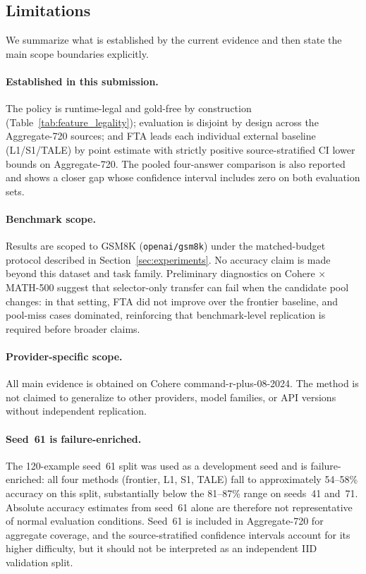 \subsection{Limitations}
\label{sec:limitations}

We summarize what is established by the current evidence and then state the
main scope boundaries explicitly.

\paragraph{Established in this submission.}
The policy is runtime-legal and gold-free by construction
(Table~\ref{tab:feature_legality}); evaluation is disjoint by design across
the Aggregate-720 sources; and FTA leads each individual external baseline
(L1/S1/TALE) by point estimate with strictly positive source-stratified CI
lower bounds on Aggregate-720.
The pooled four-answer comparison is also reported and shows a closer gap
whose confidence interval includes zero on both evaluation sets.

\paragraph{Benchmark scope.}
Results are scoped to GSM8K (\texttt{openai/gsm8k}) under the matched-budget
protocol described in Section~\ref{sec:experiments}.
No accuracy claim is made beyond this dataset and task family.
Preliminary diagnostics on Cohere $\times$ MATH-500 suggest that selector-only transfer can fail when the candidate pool changes: in that setting, FTA did not improve over the frontier baseline, and pool-miss cases dominated, reinforcing that benchmark-level replication is required before broader claims.

\paragraph{Provider-specific scope.}
All main evidence is obtained on Cohere command-r-plus-08-2024.
The method is not claimed to generalize to other providers, model families,
or API versions without independent replication.

\paragraph{Seed~61 is failure-enriched.}
The 120-example seed~61 split was used as a development seed and is
failure-enriched: all four methods (frontier, L1, S1, TALE) fall to
approximately 54--58\% accuracy on this split, substantially below the
81--87\% range on seeds~41 and~71.
Absolute accuracy estimates from seed~61 alone are therefore not
representative of normal evaluation conditions.
Seed~61 is included in Aggregate-720 for aggregate coverage, and the
source-stratified confidence intervals account for its higher difficulty,
but it should not be interpreted as an independent IID validation split.

